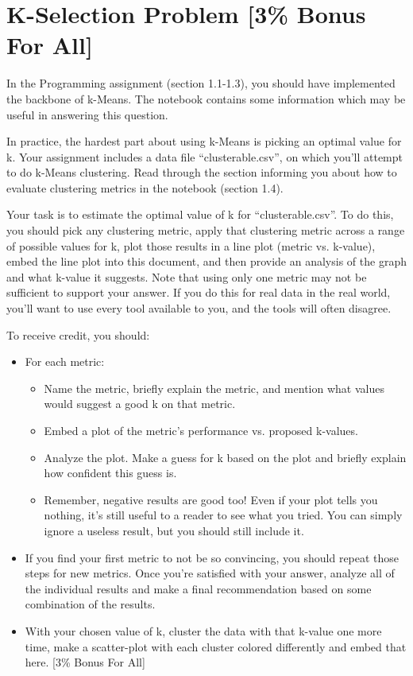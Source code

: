 \section{K-Selection Problem [3\% Bonus For All]}
In the Programming assignment (section 1.1-1.3), you should have implemented the backbone of k-Means. The notebook contains some information which may be useful in answering this question.

\bigskip In practice, the hardest part about using k-Means is picking an optimal value for k. Your assignment includes a data file ``clusterable.csv'', on which you'll attempt to do k-Means clustering. Read through the section informing you about how to evaluate clustering metrics in the notebook (section 1.4).

\bigskip Your task is to estimate the optimal value of k for ``clusterable.csv''. To do this, you should pick any clustering metric, apply that clustering metric across a range of possible values for k, plot those results in a line plot (metric vs. k-value), embed the line plot into this document, and then provide an analysis of the graph and what k-value it suggests. Note that using only one metric may not be sufficient to support your answer. If you do this for real data in the real world, you'll want to use every tool available to you, and the tools will often disagree.

\bigskip To receive credit, you should:\begin{itemize}
    \item For each metric:\begin{itemize}
        \item Name the metric, briefly explain the metric, and mention what values would suggest a good k on that metric.
        \item Embed a plot of the metric's performance vs. proposed k-values.
        \item Analyze the plot. Make a guess for k based on the plot and briefly explain how confident this guess is.
        \item Remember, negative results are good too! Even if your plot tells you nothing, it's still useful to a reader to see what you tried. You can simply ignore a useless result, but you should still include it.
    \end{itemize}
    \item If you find your first metric to not be so convincing, you should repeat those steps for new metrics. Once you're satisfied with your answer, analyze all of the individual results and make a final recommendation based on some combination of the results.
    \item With your chosen value of k, cluster the data with that k-value one more time, make a scatter-plot with each cluster colored differently and embed that here. [3\% Bonus For All]
\end{itemize}

\newpage